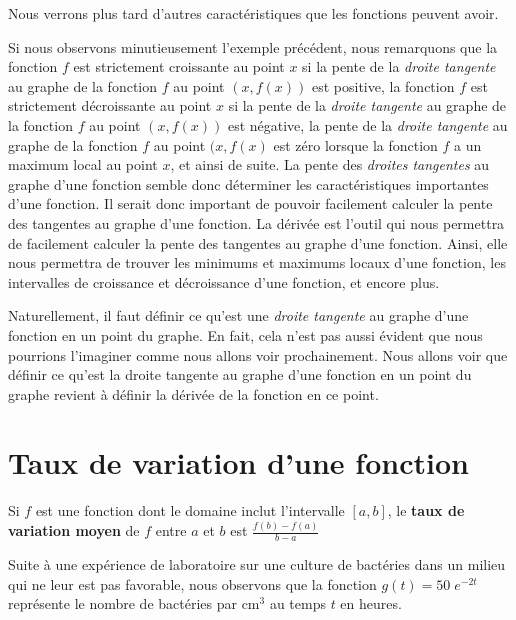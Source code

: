 {

Nous verrons plus tard d'autres caractéristiques que les fonctions peuvent
avoir.

Si nous observons minutieusement l'exemple précédent, nous remarquons que la
fonction $f$ est strictement croissante au point $x$ si la pente de la
{\em droite tangente} au graphe de la fonction $f$ au point $(x,f(x))$
est positive, la fonction $f$ est strictement décroissante au point
$x$ si la pente de la {\em droite tangente} au graphe de la fonction
$f$ au point $(x,f(x))$ est négative, la pente de la
{\em droite tangente} au graphe de la fonction $f$ au point $(x,f(x)$
est zéro lorsque la fonction $f$ a un maximum local au point $x$, et
ainsi de suite.  La pente des {\em droites tangentes} au graphe
d'une fonction semble donc déterminer les caractéristiques importantes
d'une fonction.  Il serait donc important de pouvoir facilement
calculer la pente des tangentes au graphe d'une fonction. La dérivée
est l'outil qui nous permettra de facilement calculer la pente des
tangentes au graphe d'une fonction. Ainsi, elle nous permettra de
trouver les minimums et maximums locaux d'une fonction, les
intervalles de croissance et décroissance d'une fonction, et encore
plus.

Naturellement, il faut définir ce qu'est une {\em droite tangente} au
graphe d'une fonction en un point du graphe.  En fait, cela n'est pas
aussi évident que nous pourrions l'imaginer comme nous allons voir
prochainement.  Nous allons voir que définir ce qu'est la droite tangente au
graphe d'une fonction en un point du graphe revient à définir la
dérivée de la fonction en ce point.

\section{Taux de variation d'une fonction}\label{sect_TVI}

\begin{focus}{\dfn} 
Si $f$ est une fonction dont le domaine inclut l'intervalle $[a,b]$, le
{\bfseries taux de variation moyen} de $f$ entre $a$ et $b$ est
$\displaystyle \frac{f(b)-f(a)}{b-a}$
\end{focus}

\begin{egg}
Suite à une expérience de laboratoire sur une culture de bactéries
dans un milieu qui ne leur est pas favorable, nous observons que la
fonction $\displaystyle g(t) = 50 \; e^{-2t}$ représente le
nombre de bactéries par cm$^3$ au temps $t$ en heures.


\end{egg}}

